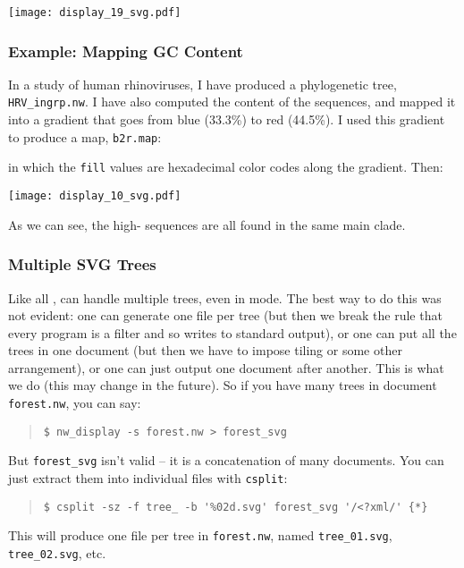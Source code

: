 
\begin{center}
\texttt{[image: display\_19\_svg.pdf]}
\end{center}

\subsubsection{Example: Mapping GC Content}
\label{sct_display_ornament_xpl_gc}

In a study of human rhinoviruses, I have produced a phylogenetic tree,
\texttt{HRV\_ingrp.nw}. I have also computed the \gc{} content of the sequences,
and mapped it into a gradient that goes from {\color{Blue} blue} (33.3\%) to
{\color{Red} red} (44.5\%). I used this gradient to produce a \css{} map,
\texttt{b2r.map}:




\noindent{}in which the \texttt{fill} values are hexadecimal color codes along
the gradient. Then:


\texttt{[image: display\_10\_svg.pdf]}
\bigskip{}

\noindent{}As we can see, the high-\gc{} sequences are all found in the same
main clade.

\subsubsection{Multiple SVG Trees}

Like all \nutils, \display{} can handle multiple trees, even in \svg{} mode.
The best way to do this was not evident: one can generate one file per tree (but
then we break the rule that every program is a filter and so writes to standard
output), or one can put all the trees in one \svg{} document (but then we have
to impose tiling or some other arrangement), or one can just output one \svg{}
document after another. This is what we do (this may change in the future). So
if you have many trees in document \texttt{forest.nw}, you can say:
\begin{quote}
\verb+$ nw_display -s forest.nw > forest_svg+
\end{quote}
But \texttt{forest\_svg} isn't valid \svg{} -- it is a concatenation of many \svg{} documents. You can just extract them into individual files with \texttt{csplit}:
\begin{quote}
\verb+$ csplit -sz -f tree_ -b '%02d.svg' forest_svg '/<?xml/' {*}+
\end{quote}
This will produce one \svg{} file per tree in \texttt{forest.nw}, named \texttt{tree\_01.svg}, \texttt{tree\_02.svg}, etc.

